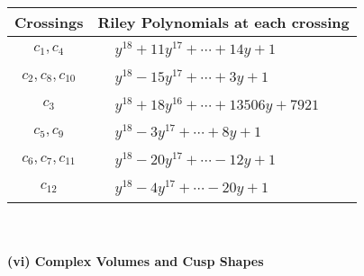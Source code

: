 \documentclass[1p]{elsarticle_modified}
\theoremstyle{definition}
\begin{document}
\begin{tabular}{m{50pt}|m{274pt}}
Crossings & \hspace{64pt}Riley Polynomials at each crossing \\
\hline $$\begin{aligned}c_{1},c_{4}\end{aligned}$$&$\begin{aligned}
&y^{18}+11 y^{17}+\cdots+14 y+1
\end{aligned}$\\
\hline $$\begin{aligned}c_{2},c_{8},c_{10}\end{aligned}$$&$\begin{aligned}
&y^{18}-15 y^{17}+\cdots+3 y+1
\end{aligned}$\\
\hline $$\begin{aligned}c_{3}\end{aligned}$$&$\begin{aligned}
&y^{18}+18 y^{16}+\cdots+13506 y+7921
\end{aligned}$\\
\hline $$\begin{aligned}c_{5},c_{9}\end{aligned}$$&$\begin{aligned}
&y^{18}-3 y^{17}+\cdots+8 y+1
\end{aligned}$\\
\hline $$\begin{aligned}c_{6},c_{7},c_{11}\end{aligned}$$&$\begin{aligned}
&y^{18}-20 y^{17}+\cdots-12 y+1
\end{aligned}$\\
\hline $$\begin{aligned}c_{12}\end{aligned}$$&$\begin{aligned}
&y^{18}-4 y^{17}+\cdots-20 y+1
\end{aligned}$\\
\hline
\end{tabular}\\~\\
\newpage\flushleft \textbf{(vi) Complex Volumes and Cusp Shapes}
\end{document}
